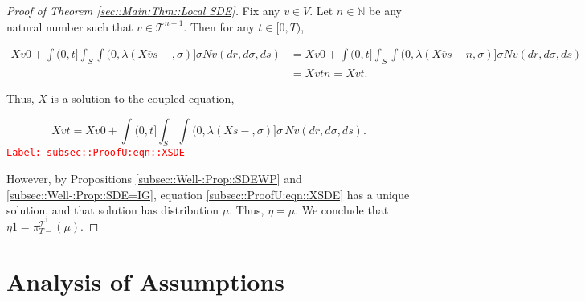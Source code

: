\documentclass[12pt]{article}
\newcommand{\mb}{\mathbb}
\newcommand{\mc}{\mathcal}
\newcommand{\ov}{\overline}
\newcommand{\tr}{\textcolor{red}}
\newcommand{\labe}[1]{\tr{\texttt{Label: #1}}}
\newcommand{\ind}{\hspace{24pt}}
\renewcommand{\v}{v}							%
\renewcommand{\S}{S}							%
\newcommand{\s}{\sigma}							%
\newcommand{\T}{T}								%
\renewcommand{\t}{t}							%
\newcommand{\proj}{\pi}							%
\renewcommand{\tt}{s}							%
\newcommand{\X}{X}								%
\newcommand{\vsi}[1]{^{#1}}						%
\newcommand{\cl}{\ov}							%
\newcommand{\ts}[1]{_{#1}}						%
\newcommand{\tree}{\mc{T}}						%
\newcommand{\sln}[1]{^{#1}}						%
\newcommand{\poiss}{N}							%
\newcommand{\rate}{\lambda}						%
\renewcommand{\r}{r}							%
\newcommand{\m}{\mu}							%
\newcommand{\mmm}{\eta}							%
\begin{document}
\begin{proof}[Proof of Theorem \ref{sec::Main:Thm::Local SDE}]
\ind Fix any \(\v\in V\). Let \(n\in \mb{N}\) be any natural number such that \(\v\in \tree\sln{n-1}\). Then for any \(\t \in [0,\T)\),

\begin{align*}
\X{\v}{0} + \int{(0,\t]}\int_\S\int{(0,\rate{}(\X{\cl{\v}}{\tt-},\s)]}\s\poiss{\v}(d\r,d\s,d\tt) &= \X{\v}{0} + \int{(0,\t]}\int_\S\int{(0,\rate{}(\X{\cl{\v}}{\tt-}{n},\s)]}\s\poiss{\v}(d\r,d\s,d\tt)\\
&=\X{\v}{\t}{n} = \X{\v}{\t}.
\end{align*}

Thus, \(\X{}{}\) is a solution to the coupled equation,

\begin{equation}
\X{\v}{\t} = \X{\v}{0} + \int{(0,\t]}\int_\S \int{(0,\rate{}(\X{}{\tt-},\s)]}\s\,\poiss{\v}(d\r,d\s,d\tt).
\label{subsec::ProofU:eqn::XSDE}
\end{equation}
\labe{subsec::ProofU:eqn::XSDE}

However, by Propositions \ref{subsec::Well-:Prop::SDEWP} and \ref{subsec::Well-:Prop::SDE=IG}, equation \eqref{subsec::ProofU:eqn::XSDE} has a unique solution, and that solution has distribution \(\m{}{}{}\). Thus, \(\mmm{}{}{} = \m{}{}{}\). We conclude that \(\mmm{}{}{1} = \proj\vsi{\tree\sln{1}}\ts{\T-}(\m{}{}{})\).

\end{proof}

\section{Analysis of Assumptions}
\end{document}
